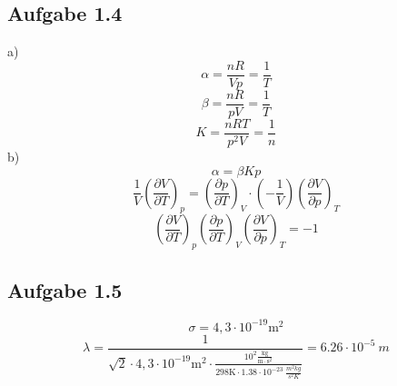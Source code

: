 \documentclass{article}
\begin{document}
\subsection{Aufgabe 1.4}
a)
\begin{equation*}
    \alpha = \frac{nR}{Vp} = \frac{1}{T}
\end{equation*}
\begin{equation*}
    \beta = \frac{nR}{pV} = \frac{1}{T}
\end{equation*}
\begin{equation*}
    K = \frac{nRT}{p^2V}=\frac{1}{n}
\end{equation*}
b)
\begin{equation*}
    \alpha = \beta K p
\end{equation*}
\begin{equation*}
    \frac{1}{V}\left(\frac{\partial V}{\partial T}\right)_p = \left(\frac{\partial p}{\partial T}\right)_V\cdot \left(-\frac{1}{V}\right)\left(\frac{\partial V}{\partial p}\right)_T
\end{equation*}
\begin{equation*}
    \left(\frac{\partial V}{\partial T}\right)_p\left(\frac{\partial p}{\partial T}\right)_V\left(\frac{\partial V}{\partial p}\right)_T = -1
\end{equation*}

\subsection{Aufgabe 1.5}
\begin{equation*}
    \sigma = 4,3\cdot 10^{-19} \mathrm{m}^2
\end{equation*}
\begin{equation*}
    \lambda = \frac{1}{\sqrt{2}\cdot 4,3\cdot 10^{-19} \mathrm{m}^2 \cdot \frac{10^2 \frac{\mathrm{kg}}{\mathrm{m}\cdot\mathrm{s^2}}}{298 \mathrm{K} \cdot 1.38 \cdot 10^{-23}\SI{}{\frac{m^2 kg}{s^2 K}}}} = 6.26 \cdot 10^{-5}\SI{}{m}
\end{equation*}
\end{document}
